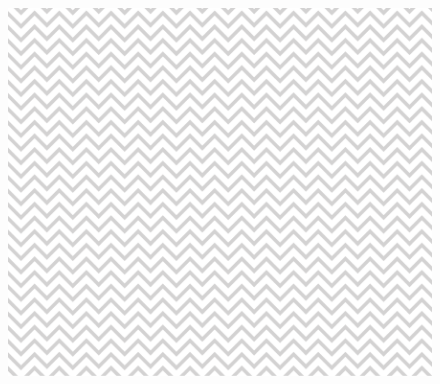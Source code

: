 \documentclass[12pt,a4paper,english]{article}
\begin{document}
\begin{figure}[!h]
\begin{center}
\includegraphics*{met_rapport_monster}          %
\end{center}
\end{figure}


  
\clearpage

\setlength{\unitlength}{1mm}  %
\end{document}

